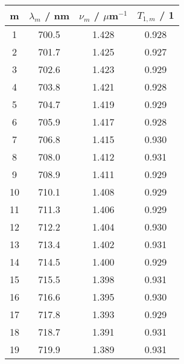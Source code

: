 \begin{tabular}{cccc}
m & $\lambda_m$ / nm & $\nu_m$ / $\mu$m${}^{-1}$ & $T_{1,m}$ / 1 \\
\hline1 & 700.5 & 1.428 & 0.928\\
2 & 701.7 & 1.425 & 0.927\\
3 & 702.6 & 1.423 & 0.929\\
4 & 703.8 & 1.421 & 0.928\\
5 & 704.7 & 1.419 & 0.929\\
6 & 705.9 & 1.417 & 0.928\\
7 & 706.8 & 1.415 & 0.930\\
8 & 708.0 & 1.412 & 0.931\\
9 & 708.9 & 1.411 & 0.929\\
10 & 710.1 & 1.408 & 0.929\\
11 & 711.3 & 1.406 & 0.929\\
12 & 712.2 & 1.404 & 0.930\\
13 & 713.4 & 1.402 & 0.931\\
14 & 714.5 & 1.400 & 0.929\\
15 & 715.5 & 1.398 & 0.931\\
16 & 716.6 & 1.395 & 0.930\\
17 & 717.8 & 1.393 & 0.929\\
18 & 718.7 & 1.391 & 0.931\\
19 & 719.9 & 1.389 & 0.931\\
\end{tabular}
